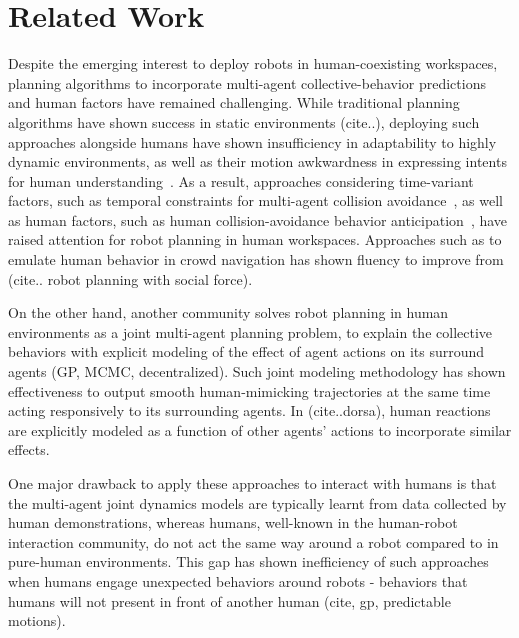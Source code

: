 \documentclass[letterpaper, 10 pt, conference]{ieeeconf}  %
\begin{document}

\section{Related Work}
Despite the emerging interest to deploy robots in human-coexisting workspaces, 
planning algorithms to incorporate multi-agent collective-behavior predictions 
and human factors have remained challenging.
While traditional planning algorithms have shown success in static 
environments (cite..), deploying such approaches alongside humans have shown 
insufficiency in adaptability to highly dynamic environments, as well as their motion 
awkwardness in expressing intents for human 
understanding~\cite{lichtenthaler2012influence,dragan2013legibility,kruse2012legible}. 
As a result, approaches considering time-variant factors, such as temporal constraints for multi-agent collision 
avoidance~\cite{van2011reciprocal}, as well as human factors, such as human 
collision-avoidance behavior anticipation~\cite{helbing1995social}, have raised attention for robot planning in human workspaces. Approaches such as to emulate human behavior in crowd 
navigation has shown fluency to improve from  
(cite.. robot planning with social force).

On the other hand, another community solves robot planning in human environments as a 
joint multi-agent planning problem, to explain the collective behaviors with 
explicit modeling of the effect of agent actions on its 
surround agents (GP, MCMC, decentralized). Such joint modeling methodology has 
shown effectiveness to output smooth human-mimicking trajectories at the same 
time acting responsively to its surrounding agents. In (cite..dorsa), human reactions are 
explicitly modeled as a function of other agents' actions to incorporate 
similar effects. 

One major drawback to apply these approaches to interact with humans is that the 
multi-agent joint dynamics models are typically learnt from data collected by 
human demonstrations, whereas humans, well-known in the human-robot 
interaction community, do not act the same way around a robot compared to in 
pure-human environments. This gap has shown 
inefficiency of such approaches when humans engage unexpected behaviors 
around robots - behaviors that humans will not present in front of another 
human (cite, gp, predictable motions). 
\end{document}
